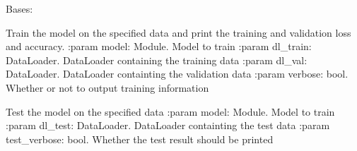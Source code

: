 \documentclass[letterpaper,10pt,english]{sphinxmanual}
\begin{document}
\begin{fulllineitems}
\label{\detokenize{trainer:trainer.Trainer}}
Bases: 

\begin{fulllineitems}
\label{\detokenize{trainer:trainer.Trainer.fit}}
Train the model on the specified data and print the training and validation loss and accuracy.
:param model: Module. Model to train
:param dl\_train: DataLoader. DataLoader containing the training data
:param dl\_val: DataLoader. DataLoader containting the validation data
:param verbose: bool. Whether or not to output training information

\end{fulllineitems}


\begin{fulllineitems}
\label{\detokenize{trainer:trainer.Trainer.test}}
Test the model on the specified data
:param model: Module. Model to train
:param dl\_test: DataLoader. DataLoader containting the test data
:param test\_verbose: bool. Whether the test result should be printed

\end{fulllineitems}


\end{fulllineitems}
\end{document}
